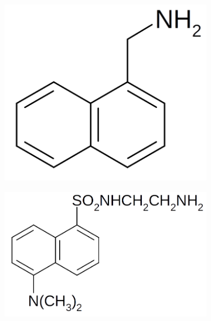 \documentclass[journal=jacsat,manuscript=article]{achemso}
\begin{document}
\begin{figure}[H]
\begin{subfigure}[b]{0.3\textwidth}
        \includegraphics[scale=0.5]{fig1C.png}
        \caption{}
        \label{fig:C}
    \end{subfigure}
    \begin{subfigure}[b]{0.3\textwidth}
        \includegraphics[scale=0.5]{fig1D.png}
        \caption{}
        \label{fig:D}
    \end{subfigure}
    \begin{subfigure}[b]{0.3\textwidth}

\end{subfigure}
\end{figure}
\end{document}
